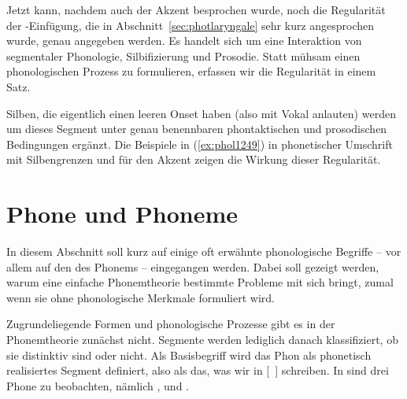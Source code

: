 \label{sec:glottalverschluss}

Jetzt kann, nachdem auch der Akzent besprochen wurde, noch die Regularität der \textipa{[P]}-Einfügung, die in Abschnitt~\ref{sec:photlaryngale} sehr kurz angesprochen wurde, genau angegeben werden.
Es handelt sich um eine Interaktion von segmentaler Phonologie, Silbifizierung und Prosodie.
Statt mühsam einen phonologischen Prozess zu formulieren, erfassen wir die Regularität in einem Satz.


Silben, die eigentlich einen leeren Onset haben (also mit Vokal anlauten) werden um dieses Segment unter genau benennbaren phontaktischen und prosodischen Bedingungen ergänzt.
Die Beispiele in (\ref{ex:phol1249}) in phonetischer Umschrift mit Silbengrenzen und \textipa{[\textprimstress]} für den Akzent zeigen die Wirkung dieser Regularität.

\begin{exe}
  \ex\label{ex:phol1249}
  \begin{xlist}
  \end{xlist}
\end{exe}

\section[Phone und Phoneme]{\Opsional Phone und Phoneme}

\label{sec:phonphonem}

In diesem Abschnitt soll kurz auf einige oft erwähnte phonologische Begriffe -- vor allem auf den des Phonems -- eingegangen werden.
Dabei soll gezeigt werden, warum eine einfache Phonemtheorie bestimmte Probleme mit sich bringt, zumal wenn sie ohne phonologische Merkmale formuliert wird.

Zugrundeliegende Formen und phonologische Prozesse gibt es in der Phonemtheorie zunächst nicht.
Segmente werden lediglich danach klassifiziert, ob sie distinktiv sind oder nicht.
Als Basisbegriff wird das Phon als phonetisch realisiertes Segment definiert, also als das, was wir in [~] schreiben.
In \textipa{[ta:k]} sind drei Phone zu beobachten, nämlich \textipa{[t]}, \textipa{[a:]} und \textipa{[k]}.


